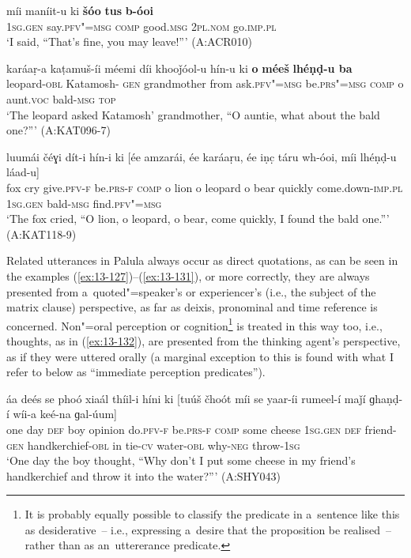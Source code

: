 \begin{exe}
\ex
\label{ex:13-129}
\gll míi maníit-u ki \textbf{šóo} \textbf{tus} \textbf{b-óoi}  \\
\textsc{1sg.gen} say.\textsc{pfv"=msg} \textsc{comp} good.\textsc{msg} \textsc{2pl.nom} go.\textsc{imp.pl} \\
\glt `I said, ``That's fine, you may leave!''' (A:ACR010)

\ex
\label{ex:13-130}
\gll karáaṛ-a kaṭamuš-íi méemi díi  khooǰóol-u hín-u ki \textbf{o} \textbf{méeš} \textbf{ lhéṇḍ-u ba} \\
leopard-\textsc{obl} Katamosh-\textsc{ gen} grandmother from  ask.\textsc{pfv"=msg} be.\textsc{prs"=msg} \textsc{comp} o aunt.\textsc{voc}  bald-\textsc{msg} \textsc{top} \\
\glt `The leopard asked Katamosh' grandmother, ``O auntie, what about the bald one?''' (A:KAT096-7)

\ex
\label{ex:13-131}
\gll luumái čéɣi dít-i hín-i ki [ée amzarái,  ée karáaṛu,
  ée iṇc̣ táru wh-óoi, míi  lhéṇḍ-u láad-u] \\
fox cry give.\textsc{pfv-f} be.\textsc{prs-f} \textsc{comp} o lion  o leopard o bear quickly come.down-\textsc{imp.pl} \textsc{1sg.gen} bald-\textsc{msg} find.\textsc{pfv"=msg}  \\
\glt `The fox cried, ``O lion, o leopard, o bear, come quickly, I found the bald one.''' (A:KAT118-9) 
\end{exe}

Related utterances in Palula always occur as direct quotations, as can be seen in the examples (\ref{ex:13-127})--(\ref{ex:13-131}), or more correctly, they are always presented from a~quoted"=speaker's or experiencer's (i.e., the subject of the matrix clause) perspective, as far as deixis, pronominal and time reference is concerned. Non"=oral perception or cognition\footnote{It is probably equally possible to classify the predicate in a~sentence like this as desiderative~-- i.e., expressing a~desire that the proposition be realised~-- rather than as an~uttererance predicate.} is treated in this way too, i.e., thoughts, as in (\ref{ex:13-132}), are presented from the thinking agent's perspective, as if they were uttered orally (a marginal exception to this is found with what I refer to below as ``immediate perception predicates''). 

\begin{exe}
\ex
\label{ex:13-132}
\gll áa deés se phoó xiaál thíil-i híni ki  [tuúš čhoót míi
  se yaar-íi rumeel-í  maǰí ɡhaṇḍ-í wíi-a keé-na ɡal-úum]\\
one day \textsc{def} boy opinion do.\textsc{pfv-f} be.\textsc{prs-f} \textsc{comp}   some cheese \textsc{1sg.gen} \textsc{def} friend-\textsc{gen} handkerchief-\textsc{obl}  in tie-\textsc{cv} water-\textsc{obl} why-\textsc{neg} throw-\textsc{1sg}\\
\glt `One day the boy thought, ``Why don't I put some cheese in my friend's handkerchief and throw it into the water?''' (A:SHY043)
\end{exe}

